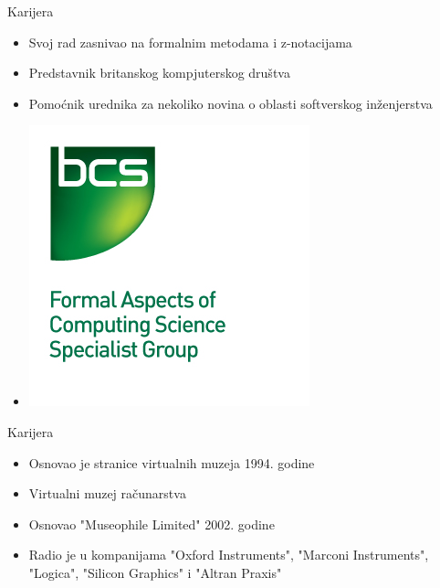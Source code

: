 \documentclass{beamer}
\begin{document}
\begin{frame}{Karijera}
    \begin{itemize}
        \item Svoj rad zasnivao na formalnim metodama i z-notacijama
        \item Predstavnik britanskog kompjuterskog društva
        \item Pomoćnik urednika za nekoliko novina o oblasti softverskog inženjerstva
	    \item[] \begin{left} \includegraphics[scale=2]{BCS-FACS_logo.jpg} \end{left}
    \end{itemize}
\end{frame}

\begin{frame}{Karijera}
    \begin{itemize}
		\item Osnovao je stranice virtualnih muzeja 1994. godine
		\item Virtualni muzej računarstva 
		\item Osnovao "Museophile Limited" 2002. godine
		\item  Radio je u kompanijama "Oxford Instruments", "Marconi Instruments", "Logica", "Silicon Graphics" i "Altran Praxis"
	\end{itemize}
\end{frame}
\end{document}
